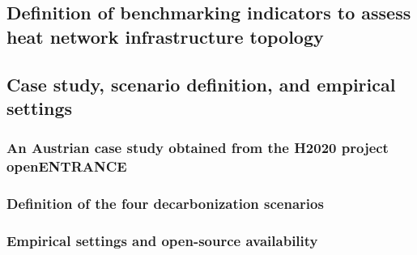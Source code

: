 \subsection{Definition of benchmarking indicators to assess heat network infrastructure topology}




\subsection{Case study, scenario definition, and empirical settings}

\subsubsection{An Austrian case study obtained from the H2020 project openENTRANCE}

\subsubsection{Definition of the four decarbonization scenarios}

\subsubsection{Empirical settings and open-source availability}




